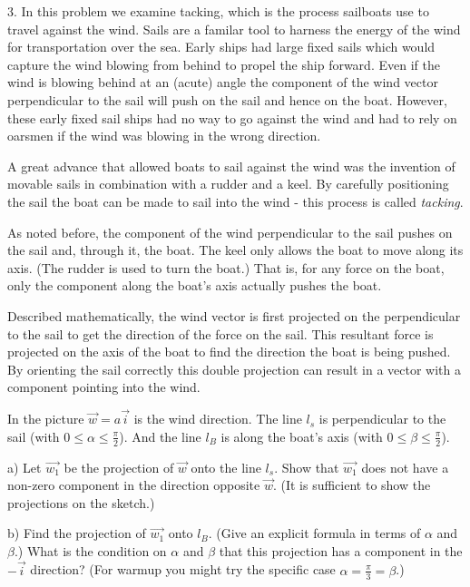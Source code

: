 \documentclass{article}
\begin{document}
3. In this problem we examine tacking, which is the process sailboats use to
travel against the wind. Sails are a familar tool to harness the energy of the
wind for transportation over the sea. Early ships had large fixed sails which
would capture the wind blowing from behind to propel the ship forward. Even if
the wind is blowing behind at an (acute) angle the component of the wind vector
perpendicular to the sail will push on the sail and hence on the boat. However,
these early fixed sail ships had no way to go against the wind and had to rely
on oarsmen if the wind was blowing in the wrong direction.

A great advance that allowed boats to sail against the wind was the invention
of movable sails in combination with a rudder and a keel. By carefully
positioning the sail the boat can be made to sail into the wind - this process
is called \emph{tacking}.

As noted before, the component of the wind perpendicular to the sail pushes on
the sail and, through it, the boat. The keel only allows the boat to move along
its axis. (The rudder is used to turn the boat.) That is, for any force on the
boat, only the component along the boat's axis actually pushes the boat.

Described mathematically, the wind vector is first projected on the
perpendicular to the sail to get the direction of the force on the sail. This
resultant force is projected on the axis of the boat to find the direction the
boat is being pushed. By orienting the sail correctly this double projection
can result in a vector with a component pointing into the wind.

In the picture $\vec{w} = a \vec{i}$ is the wind direction. The line $l_{s}$
is perpendicular to the sail (with $0 \leq \alpha \leq \frac{\pi}{2}$). And the
line $l_{B}$ is along the boat's axis (with $0 \leq \beta \leq \frac{\pi}{2}$).

a) Let $\vec{w_{1}}$ be the projection of $\vec{w}$ onto the line $l_{s}$. Show
that $\vec{w_{1}}$ does not have a non-zero component in the direction opposite
$\vec{w}$. (It is sufficient to show the projections on the sketch.)

b) Find the projection of $\vec{w_{1}}$ onto $l_{B}$. (Give an explicit formula
in terms of $\alpha$ and $\beta$.) What is the condition on $\alpha$ and $\beta$
that this projection has a component in the $-\vec{i}$ direction? (For warmup
you might try the specific case $\alpha = \frac{\pi}{3} = \beta$.)
\end{document}
